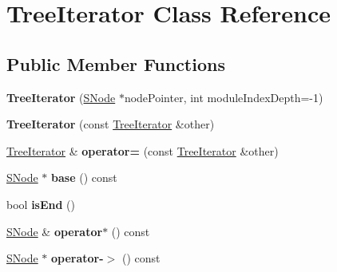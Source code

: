 \hypertarget{classTreeIterator}{}\section{Tree\+Iterator Class Reference}
\label{classTreeIterator}
\subsection*{Public Member Functions}
\begin{DoxyCompactItemize}
\item 
\mbox{\label{classTreeIterator_a58465430b9ff469f50680a0462396483}} 
{\bfseries Tree\+Iterator} (\mbox{\hyperlink{classSNode}{S\+Node}} $\ast$node\+Pointer, int module\+Index\+Depth=-\/1)
\item 
\mbox{\label{classTreeIterator_a7707ae0b0259dd1a5bf10c68d3a32102}} 
{\bfseries Tree\+Iterator} (const \mbox{\hyperlink{classTreeIterator}{Tree\+Iterator}} \&other)
\item 
\mbox{\label{classTreeIterator_a3043433b6c27dd833a1b350e738068ab}} 
\mbox{\hyperlink{classTreeIterator}{Tree\+Iterator}} \& {\bfseries operator=} (const \mbox{\hyperlink{classTreeIterator}{Tree\+Iterator}} \&other)
\item 
\mbox{\label{classTreeIterator_a9da34a0fda66a694fd7706b3f3fadb24}} 
\mbox{\hyperlink{classSNode}{S\+Node}} $\ast$ {\bfseries base} () const
\item 
\mbox{\label{classTreeIterator_a05ed8ab68f85da9240769fc65b5329f4}} 
bool {\bfseries is\+End} ()
\item 
\mbox{\label{classTreeIterator_a2221aa76bcb136636ef7c00a2217dec0}} 
\mbox{\hyperlink{classSNode}{S\+Node}} \& {\bfseries operator$\ast$} () const
\item 
\mbox{\label{classTreeIterator_ad779701a8dfc37f07f45924593463cb5}} 
\mbox{\hyperlink{classSNode}{S\+Node}} $\ast$ {\bfseries operator-\/$>$} () const
\item 
\mbox{\label{classTreeIterator_a592e1b727a1e960040b64d44078d29fd}} 

\end{DoxyCompactItemize}
